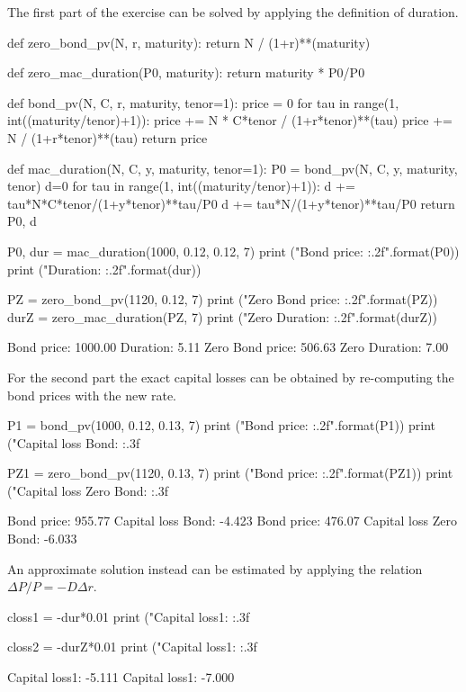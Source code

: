 \cprotEnv\begin{solution}
The first part of the exercise can be solved by applying the definition of duration.
\begin{ipython}
def zero_bond_pv(N, r, maturity):
	return N / (1+r)**(maturity)

def zero_mac_duration(P0, maturity): 
	return maturity * P0/P0 

def bond_pv(N, C, r, maturity, tenor=1):
	price = 0
	for tau in range(1, int((maturity/tenor)+1)):
		price += N * C*tenor / (1+r*tenor)**(tau)
	price += N / (1+r*tenor)**(tau)
	return price

def mac_duration(N, C, y, maturity, tenor=1): 
	P0 = bond_pv(N, C, y, maturity, tenor)
	d=0
	for tau in range(1, int((maturity/tenor)+1)):
		d += tau*N*C*tenor/(1+y*tenor)**tau/P0
	d += tau*N/(1+y*tenor)**tau/P0 
	return P0, d

P0, dur = mac_duration(1000, 0.12, 0.12, 7)
print ("Bond price: {:.2f}".format(P0))
print ("Duration: {:.2f}".format(dur))

PZ = zero_bond_pv(1120, 0.12, 7) 
print ("Zero Bond price: {:.2f}".format(PZ))
durZ = zero_mac_duration(PZ, 7)
print ("Zero Duration: {:.2f}".format(durZ))
\end{ipython}
\begin{ioutput}
Bond price: 1000.00
Duration: 5.11
Zero Bond price: 506.63
Zero Duration: 7.00
\end{ioutput}

For the second part the exact capital losses can be obtained by re-computing the bond prices with the new rate.

\begin{ipython}
P1 = bond_pv(1000, 0.12, 0.13, 7)
print ("Bond price: {:.2f}".format(P1))
print ("Capital loss Bond: {:.3f}%

PZ1 = zero_bond_pv(1120, 0.13, 7) 
print ("Bond price: {:.2f}".format(PZ1))
print ("Capital loss Zero Bond: {:.3f}%
\end{ipython}
\begin{ioutput}
Bond price: 955.77
Capital loss Bond: -4.423%
Bond price: 476.07
Capital loss Zero Bond: -6.033%
\end{ioutput}

An approximate solution instead can be estimated by applying the relation $\Delta P/P = -D\Delta r$.
\begin{ipython}
closs1 = -dur*0.01
print ("Capital loss1: {:.3f}%

closs2 = -durZ*0.01
print ("Capital loss1: {:.3f}%
\end{ipython}
\begin{ioutput}
Capital loss1: -5.111%
Capital loss1: -7.000%
\end{ioutput}
\end{solution}


